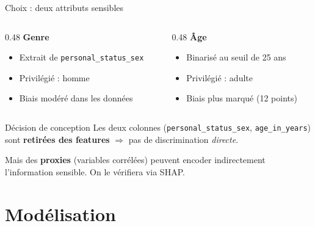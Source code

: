 \documentclass[aspectratio=169, 11pt]{beamer}
\begin{document}
\begin{frame}{Choix : deux attributs sensibles}
\begin{columns}[T]
\begin{column}{0.48\textwidth}
\textbf{\textcolor{accent}{Genre}}
\begin{itemize}
    \item Extrait de \texttt{personal\_status\_sex}
    \item Privil\'egi\'e : homme
    \item Biais mod\'er\'e dans les donn\'ees
\end{itemize}
\end{column}
\begin{column}{0.48\textwidth}
\textbf{\textcolor{fair}{\^Age}}
\begin{itemize}
    \item Binaris\'e au seuil de 25 ans
    \item Privil\'egi\'e : adulte
    \item Biais plus marqu\'e (12 points)
\end{itemize}
\end{column}
\end{columns}

\vspace{0.8em}
\begin{block}{D\'ecision de conception}
Les deux colonnes (\texttt{personal\_status\_sex}, \texttt{age\_in\_years})
sont \textbf{retir\'ees des features} $\Rightarrow$ pas de discrimination \emph{directe}.

\vspace{0.3em}
Mais des \textbf{proxies} (variables corr\'el\'ees) peuvent encoder indirectement
l'information sensible. On le v\'erifiera via SHAP.
\end{block}
\end{frame}

\section{Mod\'elisation}
\end{document}
